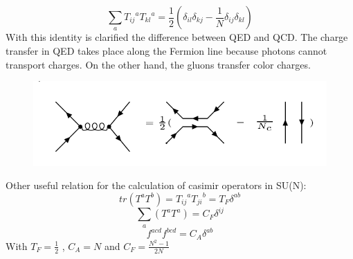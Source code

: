 \begin{equation}
\displaystyle\sum\limits_{a} {T_{ij}}^a {T_{kl}}^a = \frac{1}{2}(\delta_{il}\delta_{kj}-\frac{1}{N}\delta_{ij}\delta_{kl})
\end{equation}
With this identity is clarified the difference between QED and QCD. The charge transfer in QED takes place along the Fermion line because photons cannot transport charges. On the other hand, the gluons transfer color charges. 
\begin{figure}[h!]
\centering
\includegraphics[scale=0.6]{images/Intro/Fritz.png}
\end{figure}
 

Other useful relation for the calculation of casimir operators in SU(N):
\begin{equation}
tr(T^a T^b)= {T_{ij}}^a {T_{ji}}^b = T_F \delta^{ab}
\end{equation}
\begin{equation}
\displaystyle\sum\limits_{a} (T^a T^a) = C_F \delta^{ij}
\end{equation}
\begin{equation}
f^{acd} f^{bcd} = C_A \delta^{ab}
\end{equation}
With $  T_F = \frac{1}{2} $ , $ C_A = N $ and $ C_F = \frac{N^2 -1}{2N} $



\newpage